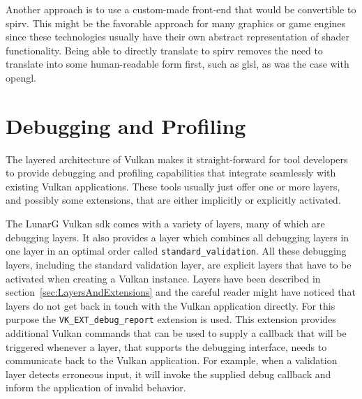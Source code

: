     Another approach is to use a custom-made front-end that would be convertible to \gls{spirv}.
    This might be the favorable approach for many graphics or game engines since these technologies usually have their own abstract representation of shader functionality.
    Being able to directly translate to \gls{spirv} removes the need to translate into some human-readable form first, such as \gls{glsl}, as was the case with \gls{opengl}.


  \section{Debugging and Profiling}
  \label{sec:DebuggingAndProfiling}
    The layered architecture of Vulkan makes it straight-forward for tool developers to provide debugging and profiling capabilities that integrate seamlessly with existing Vulkan applications.
    These tools usually just offer one or more layers, and possibly some extensions, that are either implicitly or explicitly activated.

    The LunarG Vulkan \gls{sdk} comes with a variety of layers, many of which are debugging layers.
    It also provides a layer which combines all debugging layers in one layer in an optimal order called \lstinline{standard_validation}.
    All these debugging layers, including the standard validation layer, are explicit layers that have to be activated when creating a Vulkan instance.
    Layers have been described in section~\ref{sec:LayersAndExtensions} and the careful reader might have noticed that layers do not get back in touch with the Vulkan application directly.
    For this purpose the \lstinline{VK_EXT_debug_report} extension is used.
    This extension provides additional Vulkan commands that can be used to supply a callback that will be triggered whenever a layer, that supports the debugging interface, needs to communicate back to the Vulkan application.
    For example, when a validation layer detects erroneous input, it will invoke the supplied debug callback and inform the application of invalid behavior.

